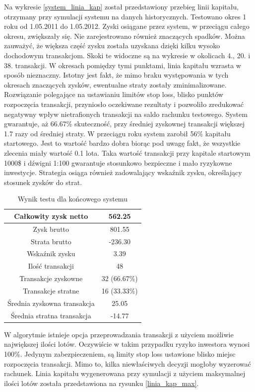 \documentclass[pdflatex,11pt]{aghdpl}
\begin{document}
Na wykresie \ref{system_linia_kap} został przedstawiony przebieg linii kapitału, otrzymany przy symulacji systemu na danych historycznych. Testowano okres 1 roku od 1.05.2011 do 1.05.2012. Zyski osiągane przez system, w przeciągu całego okresu, zwiększały się. Nie zarejestrowano również znaczących spadków. Można zauważyć, że większa część zysku została uzyskana dzięki kilku wysoko dochodowym transakcjom. Skoki te widoczne są na wykresie w okolicach 4., 20. i 38. transakcji. W okresach pomiędzy tymi punktami, linia kapitału wzrasta w sposób nieznaczny. Istotny jest fakt, że mimo braku występowania w tych okresach znaczących zysków, ewentualne straty zostały zminimalizowane. Rozwiązanie polegające na ustawianiu limitów stop loss, blisko punktów rozpoczęcia transakcji, przyniosło oczekiwane rezultaty i pozwoliło zredukować negatywny wpływ nietrafionych transakcji na saldo rachunku testowego. System gwarantuje, aż 66.67\% skuteczność, przy średniej zyskownej transakcji większej 1.7 razy od średniej straty. W przeciągu roku system zarobił 56\% kapitału startowego. Jest to wartość bardzo dobra biorąc pod uwagę fakt, że wszystkie zlecenia miały wartość 0.1 lota. Taka wartość transakcji przy kapitale startowym 1000\$ i dźwigni 1:100 gwarantuje stosunkowo bezpieczne i mało ryzykowne inwestycje. Strategia osiąga również zadowalający wskaźnik zysku, określający stosunek zysków do strat. 
\begin{table}[h!]
\begin{center}
\begin{tabular}{|c|c|}
\hline 
Całkowity zysk netto & 562.25\\
\hline
Zysk brutto & 801.55\\
\hline
Strata brutto & -236.30\\
\hline
Wskaźnik zysku & 3.39 \\
\hline
\hline
Ilość transakcji & 48 \\
\hline
Transakcje zyskowne & 32 (66.67\%) \\
\hline
Transakcje stratne & 16 (33.33\%) \\
\hline
\hline
Średnia zyskowna transakcja & 25.05 \\
\hline
Średnia stratna transakcja & -14.77 \\
\hline
\end{tabular} 
\caption{Wynik testu dla końcowego systemu}
\label{raport_system}
\end{center}
\end{table}
W algorytmie istnieje opcja przeprowadzania transakcji z użyciem możliwie największej ilości lotów. Oczywiście w takim przypadku ryzyko inwestora wynosi 100\%. Jedynym zabezpieczeniem, są limity stop loss ustawione blisko miejsc rozpoczęcia transakcji. Mimo to, kilka niewłaściwych decyzji mogłoby wyzerować rachunek. Linia kapitału wygenerowana przy symulacji z użyciem maksymalnej ilości lotów została przedstawiona na rysunku \ref{linia_kap_max}.
\end{document}

